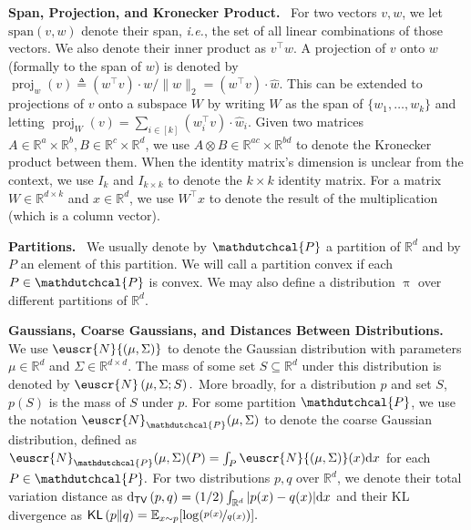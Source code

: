\documentclass[11pt,letterpaper]{article}
\DeclareMathOperator{\proj}{proj}
\theoremstyle{plain}
\theoremstyle{definition}
\theoremstyle{remark}
\newcommand{\inparen}[1]{\ensuremath{\left(#1\right)}}
\newcommand{\R}{\mathbb{R}}
\newcommand{\E}{\operatornamewithlimits{\mathbb{E}}}
\newcommand{\tv}[2]{\operatorname{d}_{\mathsf{TV}}{\inparen{#1,#2}}}
\newcommand{\kl}[2]{\operatornamewithlimits{\mathsf{KL}}{\inparen{#1\|#2}}}
\newcommand{\sfrac}[2]{{#1/#2}}
\newcommand{\nfrac}[2]{\nicefrac{#1}{#2}}
\newcommand{\wh}[1]{\widehat{#1}}
\newcommand{\customcal}[1]{\euscr{#1}}
\newcommand{\cN}{\customcal{N}}
\renewcommand{\paragraph}[1]{\medskip \noindent\textbf{#1}~}
\newcommand{\ie}{\emph{i.e.}}
\renewcommand{\pi}{\uppi}
\newcommand{\hypo}[1]{\mathdutchcal{#1}}
\newcommand{\hyP}{\hypo{P}}
\renewcommand{\d}{{\rm d}}
\newcommand{\normal}[2]{\cN{\inparen{#1,#2}}}
\newcommand{\normalMass}[3]{\cN\inparen{#1, #2; #3}}
\begin{document}
{\paragraph{Span, Projection, and Kronecker Product.}
For two vectors $v,w$, we let $\mathrm{span}(v,w)$ denote their span, \ie{}, the set of
all linear combinations of those vectors. We also denote their inner product as $v^\top w.$
A projection of $v$ onto $w$ (formally to the span of $w$) is denoted by $\proj_w(v) \triangleq (w^\top v) \cdot w/\|w\|_2 = (w^\top v) \cdot \wh{w}.$ This can be extended to projections of $v$ onto a subspace $W$ by writing $W$ as the span of $\{w_1,\dots,w_k\}$ and letting $\proj_W(v) = \sum_{i \in [k]} (w_i^\top v) \cdot \wh{w}_i.$
Given two matrices $A \in \R^{a} \times \R^b, B \in \R^{c} \times \R^d$, we use $A \otimes B \in \R^{ac} \times \R^{bd}$ to denote the Kronecker product between them. When the identity matrix's dimension is unclear from the context, we use $I_k$ and $I_{k\times k}$ to denote the $k\times k$ identity matrix.
For a matrix $W \in \R^{d \times k}$ and $x \in \R^d$, we use $W^\top x$ to denote the result of the multiplication (which is a column vector).

\paragraph{Partitions.}
We usually denote by $\hyP$ a partition of $\R^d$ and by $P$ an element of this partition. We will call a partition convex if each $P \in \hyP$ is convex. We may also define a distribution $\pi$ over different partitions of $\R^d.$

\paragraph{Gaussians, Coarse Gaussians, and Distances Between Distributions.}
We use $\normal{\mu}{\Sigma}$ to denote the Gaussian distribution with parameters $\mu \in \R^d$ and $\Sigma \in \R^{d \times d}. $
The mass of some set $S \subseteq \R^d$ under this distribution is denoted by $\normalMass{\mu}{\Sigma}{S}.$ More broadly, for a distribution $p$  and set $S$, $p(S)$ is the mass of $S$ under $p$. For some partition $\hyP$, we use the notation $\cN_{\hyP}(\mu, \Sigma)$ to denote the coarse Gaussian distribution, defined as
$\cN_{\hyP}(\mu, \Sigma)(P) = \int_P \normal{\mu}{\Sigma}(x) \d x$ for each $P \in \hyP.$ For two distributions $p,q$ over $\R^d$, we denote their total variation distance as $\tv{p}{q} = \inparen{\sfrac{1}{2}} \int_{\R^d} |p(x) - q(x)| \d x$ and their KL divergence as 
$\kl{p}{q}= \E_{x \sim p}[\log ( \nfrac{p(x)}{q(x)} )].$


}
\end{document}
